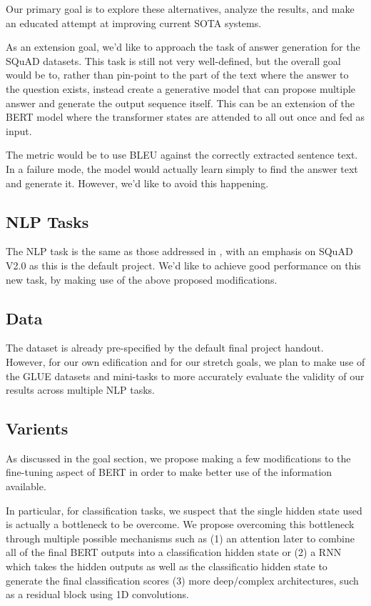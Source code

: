 \documentclass{article}
\begin{document}
Our primary goal is to explore these alternatives, analyze the results, and make an educated attempt at improving current SOTA systems.

As an extension goal, we'd like to approach the task of answer generation for the SQuAD datasets. This task is still not very well-defined, but the overall goal would be to, rather than pin-point to the part of the text where the answer to the question exists, instead create a generative model that can propose multiple answer and generate the output sequence itself. This can be an extension of the BERT model where the transformer states are attended to all out once and fed as input.

The metric would be to use BLEU against the correctly extracted sentence text. In a failure mode, the model would actually learn simply to find the answer text and generate it. However, we'd like to avoid this happening. 

\subsection{NLP Tasks}
The NLP task is the same as those addressed in \cite{BERT}, with an emphasis on SQuAD V2.0 as this is the default project. We'd like to achieve good performance on this new task, by making use of the above proposed modifications.

\subsection{Data}
The dataset is already pre-specified by the default final project handout. However, for our own edification and for our stretch goals, we plan to make use of the GLUE datasets and mini-tasks to more accurately evaluate the validity of our results across multiple NLP tasks. 

\subsection{Varients}
As discussed in the goal section, we propose making a few modifications to the fine-tuning aspect of BERT in order to make better use of the information available.

In particular, for classification tasks, we suspect that the single hidden state used is actually a bottleneck to be overcome. We propose overcoming this bottleneck through multiple possible mechanisms such as (1) an attention later to combine all of the final BERT outputs into a classification hidden state or (2) a RNN which takes the hidden outputs as well as the classificatio hidden state to generate the final classification scores (3) more deep/complex architectures, such as a residual block using 1D convolutions.
\end{document}
